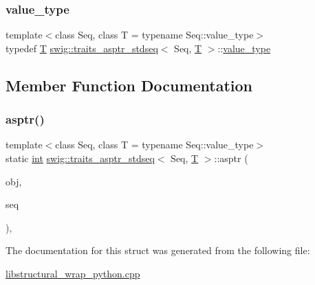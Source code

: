 \mbox{\label{structswig_1_1traits__asptr__stdseq_a18bb424b58bc29aa995ff6d246499ee5}} 
\subsubsection{\texorpdfstring{value\+\_\+type}{value\_type}}
{\footnotesize\ttfamily template$<$class Seq, class T = typename Seq\+::value\+\_\+type$>$ \\
typedef \hyperlink{fmt_8h_a0acb682b8260ab1c60b918599864e2e5}{T} \hyperlink{structswig_1_1traits__asptr__stdseq}{swig\+::traits\+\_\+asptr\+\_\+stdseq}$<$ Seq, \hyperlink{fmt_8h_a0acb682b8260ab1c60b918599864e2e5}{T} $>$\+::\hyperlink{structswig_1_1traits__asptr__stdseq_a18bb424b58bc29aa995ff6d246499ee5}{value\+\_\+type}}



\subsection{Member Function Documentation}
\mbox{\label{structswig_1_1traits__asptr__stdseq_a20c63611de0e0b36a51bf9b1ff41af48}} 
\subsubsection{\texorpdfstring{asptr()}{asptr()}}
{\footnotesize\ttfamily template$<$class Seq, class T = typename Seq\+::value\+\_\+type$>$ \\
static \hyperlink{lp__lib_8h_adeb9ec6400320e4923ac9d836d509ddb}{int} \hyperlink{structswig_1_1traits__asptr__stdseq}{swig\+::traits\+\_\+asptr\+\_\+stdseq}$<$ Seq, \hyperlink{fmt_8h_a0acb682b8260ab1c60b918599864e2e5}{T} $>$\+::asptr (\begin{DoxyParamCaption}\item[{Py\+Object $\ast$}]{obj,  }\item[{\hyperlink{structswig_1_1traits__asptr__stdseq_acc3237a1f41e649f169c938930068a35}{sequence} $\ast$$\ast$}]{seq }\end{DoxyParamCaption})\hspace{0.3cm}{\ttfamily [inline]}, {\ttfamily [static]}}



The documentation for this struct was generated from the following file\+:\begin{DoxyCompactItemize}
\item 
\hyperlink{libstructural__wrap__python_8cpp}{libstructural\+\_\+wrap\+\_\+python.\+cpp}\end{DoxyCompactItemize}
